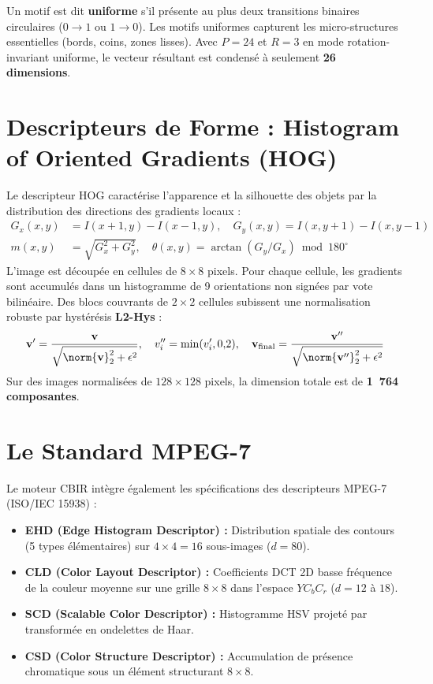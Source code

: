 Un motif est dit \textbf{uniforme} s'il présente au plus deux transitions binaires circulaires ($0 \to 1$ ou $1 \to 0$). Les motifs uniformes capturent les micro-structures essentielles (bords, coins, zones lisses). Avec $P = 24$ et $R = 3$ en mode rotation-invariant uniforme, le vecteur résultant est condensé à seulement \textbf{26 dimensions}.

\section{Descripteurs de Forme : Histogram of Oriented Gradients (HOG)}

Le descripteur HOG \cite{dalal2005} caractérise l'apparence et la silhouette des objets par la distribution des directions des gradients locaux :
\begin{align}
    G_x(x, y) &= I(x + 1, y) - I(x - 1, y), \quad G_y(x, y) = I(x, y + 1) - I(x, y - 1) \\
    m(x, y) &= \sqrt{G_x^2 + G_y^2}, \quad \theta(x, y) = \arctan(G_y / G_x) \bmod 180^\circ
\end{align}
L'image est découpée en cellules de $8 \times 8$ pixels. Pour chaque cellule, les gradients sont accumulés dans un histogramme de 9 orientations non signées par vote bilinéaire. Des blocs couvrants de $2 \times 2$ cellules subissent une normalisation robuste par hystérésis \textbf{L2-Hys} :
\begin{equation}
    \mathbf{v}' = \frac{\mathbf{v}}{\sqrt{\norm{\mathbf{v}}_2^2 + \epsilon^2}}, \quad v''_i = \min(v'_i, 0{,}2), \quad \mathbf{v}_{\text{final}} = \frac{\mathbf{v}''}{\sqrt{\norm{\mathbf{v}''}_2^2 + \epsilon^2}}
\end{equation}
Sur des images normalisées de $128 \times 128$ pixels, la dimension totale est de \textbf{1~764 composantes}.

\section{Le Standard MPEG-7}
Le moteur CBIR intègre également les spécifications des descripteurs MPEG-7 (ISO/IEC 15938) :
\begin{itemize}[nosep]
    \item \textbf{EHD (Edge Histogram Descriptor) :} Distribution spatiale des contours (5 types élémentaires) sur $4 \times 4 = 16$ sous-images ($d = 80$).
    \item \textbf{CLD (Color Layout Descriptor) :} Coefficients DCT 2D basse fréquence de la couleur moyenne sur une grille $8 \times 8$ dans l'espace $YC_bC_r$ ($d = 12$ à $18$).
    \item \textbf{SCD (Scalable Color Descriptor) :} Histogramme HSV projeté par transformée en ondelettes de Haar.
    \item \textbf{CSD (Color Structure Descriptor) :} Accumulation de présence chromatique sous un élément structurant $8 \times 8$.
\end{itemize}

